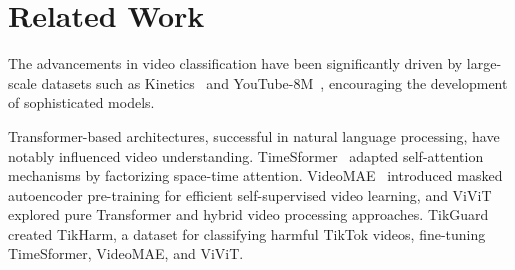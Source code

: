 \section{Related Work}


The advancements in video classification have been significantly driven by large-scale datasets such as Kinetics~\cite{kay2017kinetics} and YouTube-8M~\cite{abu2016youtube}, encouraging the development of sophisticated models.




Transformer-based architectures, successful in natural language processing, have notably influenced video understanding.
TimeSformer~\cite{bertasius2021space} adapted self-attention mechanisms by factorizing space-time attention.
VideoMAE~\cite{tong2022videomae} introduced masked autoencoder pre-training for efficient self-supervised video learning, and ViViT~\cite{arnab2021vivit} explored pure Transformer and hybrid video processing approaches.
TikGuard~\cite{balat2024tikguard} created TikHarm, a dataset for classifying harmful TikTok videos, fine-tuning TimeSformer, VideoMAE, and ViViT. 

